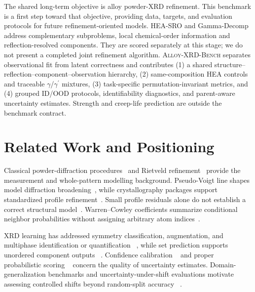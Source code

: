 \documentclass[sigconf,review,anonymous]{acmart}
\newcommand{\dataset}{\textsc{Alloy-XRD-Bench}}
\newcommand{\gphase}{$\gamma$}
\newcommand{\gp}{\ensuremath{\gamma^{\prime}}}
\newenvironment{revision}{\ifdefined\markedcopy\color{red!70!black}\else\color{black}\fi}{}
\begin{document}
\begin{revision}
The shared long-term objective is alloy powder-XRD refinement. This benchmark
is a first step toward that objective, providing data, targets, and evaluation
protocols for future refinement-oriented models. HEA-SRO and Gamma-Decomp
address complementary subproblems, local chemical-order information and
reflection-resolved components. They are scored separately at this stage;
we do not present a completed joint refinement algorithm.
\dataset{} separates observational fit from latent correctness and contributes
(1) a shared structure--reflection--component--observation hierarchy, (2)
same-composition HEA controls and traceable \gphase{}/\gp{} mixtures, (3)
task-specific permutation-invariant metrics, and (4) grouped ID/OOD protocols,
identifiability diagnostics, and parent-aware uncertainty estimates. Strength
and creep-life prediction are outside the benchmark contract.
\end{revision}

\section{Related Work and Positioning}

Classical powder-diffraction procedures~\cite{klug1974xray} and Rietveld
refinement~\cite{rietveld1969,young1993rietveld} provide the measurement and
whole-pattern modelling background. Pseudo-Voigt line shapes model diffraction
broadening~\cite{thompson1987tch}, while crystallography packages support
standardized profile refinement~\cite{toby2013gsasii,lutterotti2010maud}.
Small profile residuals alone do not establish a correct structural
model~\cite{toby2006rvalues}. Warren--Cowley coefficients
summarize conditional neighbor probabilities without assigning arbitrary atom
indices~\cite{cowley1950}.

XRD learning has addressed symmetry classification, augmentation, and
multiphase identification or quantification
~\cite{vecsei2019symmetry,oviedo2019xrd,lee2020multiphase,greasley2023multiphase,szymanski2021crabnet},
while set prediction supports unordered component outputs
~\cite{lee2019settransformer,carion2020detr}. Confidence calibration
~\cite{guo2017calibration} and proper probabilistic scoring
~\cite{gneiting2007proper} concern the quality of uncertainty estimates.
Domain-generalization benchmarks and uncertainty-under-shift evaluations
motivate assessing controlled shifts beyond random-split accuracy
~\cite{gulrajani2021domainbed,koh2021wilds,ovadia2019uncertainty}.
\end{document}
